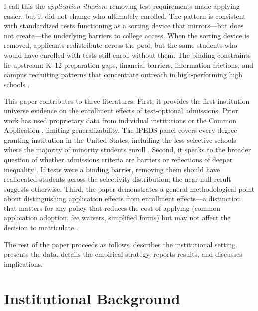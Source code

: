 \documentclass[12pt]{article}
\begin{document}
I call this the \textit{application illusion}: removing test requirements made applying easier, but it did not change who ultimately enrolled. The pattern is consistent with standardized tests functioning as a sorting device that mirrors---but does not create---the underlying barriers to college access. When the sorting device is removed, applicants redistribute across the pool, but the same students who would have enrolled with tests still enroll without them. The binding constraints lie upstream: K--12 preparation gaps, financial barriers, information frictions, and campus recruiting patterns that concentrate outreach in high-performing high schools \citep{Hoxby2013Missing,Dynarski2021Closing}.

This paper contributes to three literatures. First, it provides the first institution-universe evidence on the enrollment effects of test-optional admissions. Prior work has used proprietary data from individual institutions or the Common Application \citep{Bennett2022TestOptional,Dynarski2023TestOptional,Saboe2023TestOptional}, limiting generalizability. The IPEDS panel covers every degree-granting institution in the United States, including the less-selective schools where the majority of minority students enroll \citep{Bound2010WhyHave}. Second, it speaks to the broader question of whether admissions criteria are barriers or reflections of deeper inequality \citep{Dale2002Estimating,Arcidiacono2011Does,Bleemer2022Affirmative}. If tests were a binding barrier, removing them should have reallocated students across the selectivity distribution; the near-null result suggests otherwise. Third, the paper demonstrates a general methodological point about distinguishing application effects from enrollment effects---a distinction that matters for any policy that reduces the cost of applying (common application adoption, fee waivers, simplified forms) but may not affect the decision to matriculate \citep{Pallais2015Small,Smith2021Unintended}.

The rest of the paper proceeds as follows.  describes the institutional setting.  presents the data.  details the empirical strategy.  reports results, and  discusses implications.


\section{Institutional Background}
\label{sec:background}
\end{document}
